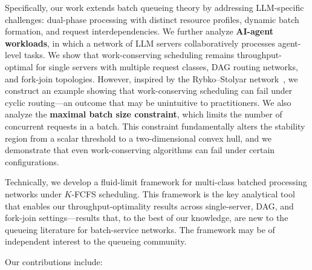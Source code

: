 \documentclass[11pt]{article}
\theoremstyle{plain}
\theoremstyle{definition}
\theoremstyle{remark}
\begin{document}
Specifically, our work extends batch queueing theory by addressing LLM-specific challenges: dual-phase processing with distinct resource profiles, dynamic batch formation, and request interdependencies. We further analyze \textbf{AI-agent workloads}, in which a network of LLM servers collaboratively processes agent-level tasks. We show that work-conserving scheduling remains throughput-optimal for single servers with multiple request classes, DAG routing networks, and fork-join topologies. However, inspired by the Rybko--Stolyar network~\citep{rybko1992ergodicity}, we construct an example showing that work-conserving scheduling can fail under cyclic routing---an outcome that may be unintuitive to practitioners. We also analyze the \textbf{maximal batch size constraint}, which limits the number of concurrent requests in a batch. This constraint fundamentally alters the stability region from a scalar threshold to a two-dimensional convex hull, and we demonstrate that even work-conserving algorithms can fail under certain configurations.

Technically, we develop a fluid-limit framework for multi-class batched processing networks under $K$-FCFS scheduling. This framework is the key analytical tool that enables our throughput-optimality results across single-server, DAG, and fork-join settings---results that, to the best of our knowledge, are new to the queueing literature for batch-service networks. The framework may be of independent interest to the queueing community.

Our contributions include:
\end{document}
